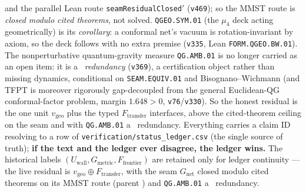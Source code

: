 \begin{keyboxnb}
and the parallel Lean route \texttt{seamResidualClosed$'$} (\texttt{v469}); so the MMST route is \emph{closed
modulo cited theorems}, not solved. \texttt{QGEO.SYM.01} (the $\mu_4$ deck acting geometrically) is its \emph{corollary}: a conformal net's vacuum
is rotation-invariant by axiom, so the deck follows with no extra premise (\texttt{v335}, Lean
\texttt{FORM.QGEO.BW.01}). The nonperturbative quantum-gravity measure \texttt{QG.AMB.01} is no longer carried as an
open item: it is a \mC\ \emph{redundancy} (\texttt{v369}), a certification object rather than missing dynamics,
conditional on \texttt{SEAM.EQUIV.01} and Bisognano--Wichmann (and TFPT is moreover rigorously gap-decoupled from the
general Euclidean-QG conformal-factor problem, margin $1.648>0$, \texttt{v76}/\texttt{v330}). So the honest residual is
the one unit $v_{\mathrm{geo}}$ plus the typed $F_{\mathrm{transfer}}$ interfaces, above the cited-theorem ceiling on
the seam and with \texttt{QG.AMB.01} a \mC\ redundancy.
\noindent Everything carries a claim ID resolving to a row of \texttt{verification/status\_ledger.csv}
(the single source of truth); \textbf{if the text and the ledger ever disagree, the ledger wins.} The
historical labels $(U_{\mathrm{wall}},G_{\mathrm{metric}},F_{\mathrm{frontier}})$ are retained only for
ledger continuity --- the live residual is $v_{\mathrm{geo}}\oplus F_{\mathrm{transfer}}$, with the seam
$G_{\mathrm{net}}$ closed modulo cited theorems on its MMST route (parent \mO) and \texttt{QG.AMB.01} a \mC\
redundancy.
\markerkey
\end{keyboxnb}
